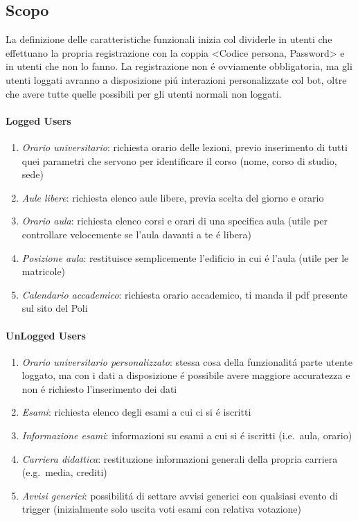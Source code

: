 \documentclass[]{article}
\begin{document}
\subsection{Scopo}
La definizione delle caratteristiche funzionali inizia col dividerle in utenti che effettuano la propria registrazione con la coppia <Codice persona, Password> e in utenti che non lo fanno. La registrazione non é ovviamente obbligatoria, ma gli utenti loggati avranno a disposizione piú interazioni personalizzate col bot, oltre che avere tutte quelle possibili per gli utenti normali non loggati.

\paragraph{Logged Users}
\begin{enumerate}
\item \textit{Orario universitario}: richiesta orario delle lezioni, previo inserimento di tutti quei parametri che servono per identificare il corso (nome, corso di studio, sede)
\item \textit{Aule libere}: richiesta elenco aule libere, previa scelta del giorno e orario 
\item \textit{Orario aula}: richiesta elenco corsi e orari di una specifica aula (utile per controllare velocemente se l'aula davanti a te é libera)
\item \textit{Posizione aula}: restituisce semplicemente l'edificio in cui é l'aula (utile per le matricole)
\item \textit{Calendario accademico}: richiesta orario accademico, ti manda il pdf presente sul sito del Poli 
\end{enumerate}

\paragraph{UnLogged Users}
\begin{enumerate}
\item \textit{Orario universitario personalizzato}: stessa cosa della funzionalitá parte utente loggato, ma con i dati a disposizione é possibile avere maggiore accuratezza e non é richiesto l'inserimento dei dati
\item \textit{Esami}: richiesta elenco degli esami a cui ci si é iscritti
\item \textit{Informazione esami}: informazioni su esami a cui si é iscritti (i.e.\ aula, orario) 
\item \textit{Carriera didattica}: restituzione informazioni generali della propria carriera (e.g.\ media, crediti)
\item \textit{Avvisi generici}: possibilitá di settare avvisi generici con qualsiasi evento di trigger (inizialmente solo uscita voti esami con relativa votazione)
\end{enumerate}
\end{document}
